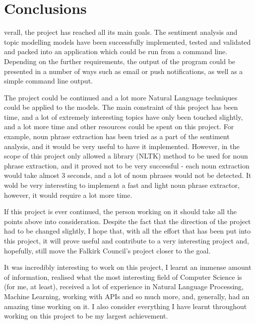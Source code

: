 \let\textcircled=\pgftextcircled
\chapter{Conclusions}
\label{chap:conclusions}

verall, the project has reached all its main goals. The sentiment analysis and topic modelling models have been successfully implemented, tested and validated and packed into an application which could be run from a command line. Depending on the further requirements, the output of the program could be presented in a number of ways such as email or push notifications, as well as a simple command line output. 

\par The project could be continued and a lot more Natural Language techniques could be applied to the models. The main constraint of this project has been time, and a lot of extremely interesting topics have only been touched slightly, and a lot more time and other resources could be spent on this project. For example, noun phrase extraction has been tried as a part of the sentiment analysis, and it would be very useful to have it implemented. However, in the scope of this project only allowed a library (NLTK) method to be used for noun phrase extraction, and it proved not to be very successful - each noun extraction would take almost 3 seconds, and a lot of noun phrases would not be detected. It wold be very interesting to implement a fast and light noun phrase extractor, however, it would require a lot more time. 

If this project is ever continued, the person working on it should take all the points above into consideration. Despite the fact that the direction of the project had to be changed slightly, I hope that, with all the effort that has been put into this project, it will prove useful and contribute to a very interesting project and, hopefully, still move the Falkirk Council's project closer to the goal. 

It was incredibly interesting to work on this project, I learnt an immense amount of information, realised what the most interesting field of Computer Science is (for me, at least), received a lot of experience in Natural Language Processing, Machine Learning, working with APIs and so much more, and, generally, had an amazing time working on it. I also consider everything I have learnt throughout working on this project to be my largest achievement. 